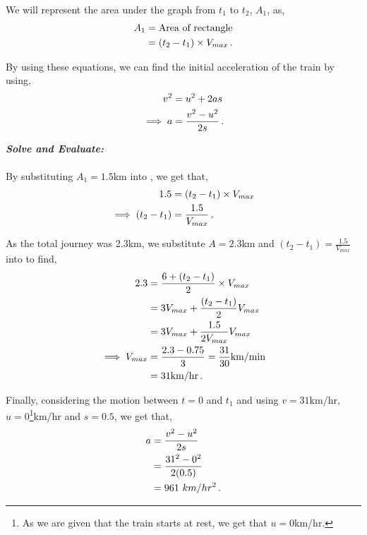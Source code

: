 \begin{subquestions}
\begin{subsubquestions}
We will represent the area under the graph from $t_1$ to $t_2$, $A_1$, as,
\begin{align}
	A_1 & = \text{Area of rectangle} \nonumber \\
	& = (t_2-t_1)\times V_{max} \,. \label{2011:q6:AEqn2}
\end{align}  
	
By using these equations, we can find the initial acceleration of the train by using,
\begin{align}
	v^2 & = u^2 + 2as \nonumber \\
	\implies a & = \frac{v^2-u^2}{2s} \,.
\end{align}




\textbf{\textit{Solve and Evaluate:}} \\ \\
By substituting $A_1=1.5$km into , we get that,
\begin{align}
	1.5 & = (t_2-t_1)\times V_{max} \nonumber \\
	\implies (t_2-t_1) & = \frac{1.5}{V_{max}} \,.
\end{align}

As the total journey was 2.3km, we substitute $A=2.3$km and $(t_2-t_1) = \frac{1.5}{V_{max}}$ into  to find,
\begin{align}
	2.3 & = \frac{6 + (t_2-t_1)}{2}\times V_{max} \nonumber \\
		& = 3V_{max} + \frac{(t_2-t_1)}{2}V_{max} \nonumber \\
		& = 3V_{max} + \frac{1.5}{2V_{max}}V_{max} \nonumber \\
		\implies V_{max} & = \frac{2.3-0.75}{3} = \frac{31}{30} \text{km/min} \nonumber \\
		               & = 31\text{km/hr} \,.
\end{align}

Finally, considering the motion between $t=0$ and $t_1$ and using $v=31$km/hr, $u=0$\footnote{As we are given that the train starts at rest, we get that $u=0$km/hr.}km/hr and $s=0.5$, we get that,
\begin{align}
	a & = \frac{v^2-u^2}{2s} \nonumber \\
	  & = \frac{31^2-0^2}{2(0.5)} \nonumber \\
	  & = 961 ~km/hr^2 \,.
\end{align}

\end{subsubquestions}	
	
	

\end{subquestions}
